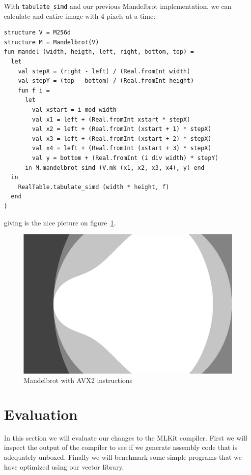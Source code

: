 \documentclass{article}
\begin{document}
With \verb!tabulate_simd! and our previous Mandelbrot implementation, we can calculate and entire image with 4 pixels at a time:
\begin{verbatim}
structure V = M256d
structure M = Mandelbrot(V)
fun mandel (width, heigth, left, right, bottom, top) =
  let
    val stepX = (right - left) / (Real.fromInt width)
    val stepY = (top - bottom) / (Real.fromInt height)
    fun f i =
      let
        val xstart = i mod width
        val x1 = left + (Real.fromInt xstart * stepX)
        val x2 = left + (Real.fromInt (xstart + 1) * stepX)
        val x3 = left + (Real.fromInt (xstart + 2) * stepX)
        val x4 = left + (Real.fromInt (xstart + 3) * stepX)
        val y = bottom + (Real.fromInt (i div width) * stepY)
      in M.mandelbrot_simd (V.mk (x1, x2, x3, x4), y) end
  in
    RealTable.tabulate_simd (width * height, f)
  end
)
\end{verbatim}
giving is the nice picture on figure~\ref{fig:mandel}.
\begin{figure}
    \label{fig:mandel}
    \caption{Mandelbrot with AVX2 instructions}
    \includegraphics[width=\textwidth]{mandel.png}
\end{figure}

\section{Evaluation}
In this section we will evaluate our changes to the MLKit compiler. First we will inspect the output of the compiler to see if we generate assembly code that is adequately unboxed. Finally we will benchmark some simple programs that we have optimized using our vector library.
\end{document}
